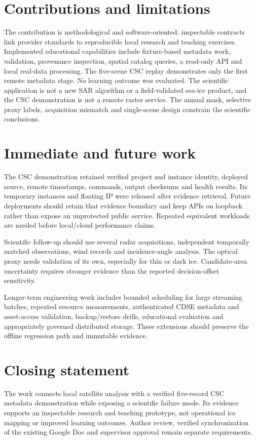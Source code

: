 \section{Contributions and limitations}

The contribution is methodological and software-oriented: inspectable contracts link
provider standards to reproducible local research and teaching exercises. Implemented
educational capabilities include fixture-based metadata work, validation, provenance
inspection, spatial catalog queries, a read-only API and local real-data processing. The
five-scene CSC replay demonstrates only the first remote metadata stage. No learning outcome
was evaluated. The scientific application is not a new SAR algorithm or a field-validated
sea-ice product, and the CSC demonstration is not a remote raster service. The annual mask,
selective proxy labels, acquisition mismatch and single-scene design constrain the scientific
conclusions.

\section{Immediate and future work}

The CSC demonstration retained verified project and instance identity, deployed source,
remote timestamps, commands, output checksums and health results. Its temporary instances
and floating IP were released after evidence retrieval. Future deployments should retain
that evidence boundary and keep APIs on loopback rather than expose an unprotected public
service. Repeated equivalent workloads are needed before local/cloud performance claims.

Scientific follow-up should use several radar acquisitions, independent temporally matched
observations, wind records and incidence-angle analysis. The optical proxy needs validation
of its own, especially for thin or dark ice. Candidate-area uncertainty requires stronger
evidence than the reported decision-offset sensitivity.

Longer-term engineering work includes bounded scheduling for large streaming batches,
repeated resource measurements, authenticated CDSE metadata and asset-access validation,
backup/restore drills, educational evaluation and appropriately governed distributed storage.
These extensions should preserve the offline regression path and immutable evidence.

\section{Closing statement}

The work connects local satellite analysis with a verified five-record CSC metadata
demonstration while exposing a scientific failure mode. Its evidence supports an inspectable
research and teaching prototype, not operational ice mapping or improved learning outcomes.
Author review, verified synchronization of the existing Google Doc and supervisor approval
remain separate requirements.
